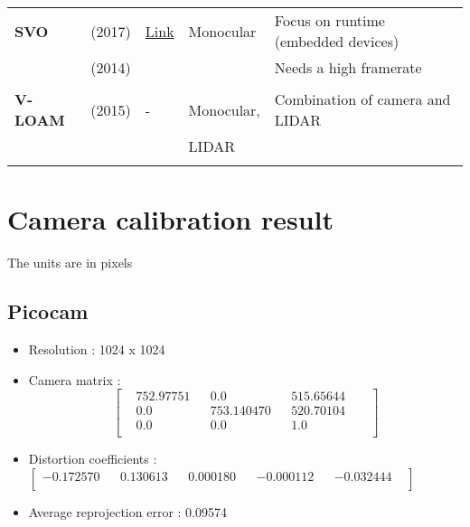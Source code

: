 {\begin{longtable}{l|l|l|l|l}
			\textbf{SVO}           & \cite{7782863} (2017)         & {\href{https://github.com/uzh-rpg/rpg_svo}{Link}}                  & Monocular             & Focus on runtime (embedded devices)\\
			& \cite{Forster2014ICRA} (2014)        &                                                                    &                       & Needs a high framerate\\
			&                                   &                                                                    &                       &\\
			\textbf{V-LOAM}        & \cite{Zhang2015} (2015)           & -                                                                  & Monocular,            & Combination of camera and LIDAR\\
			&                                   &                                                                    & LIDAR                 &\\
			&                                   &                                                                    &                       &\\
		\end{longtable}				
		\newpage
	
\section{Camera calibration result}
\label{section:A.2}
The units are in pixels
\subsection{Picocam}

\begin{itemize}
	\setlength\itemsep{1em}
	\item Resolution : 1024 x 1024
	\item Camera matrix : 
	      \begin{equation*}     
			\begin{bmatrix}
				& 752.97751 & & 0.0 & &  515.65644 & &  \\
				& 0.0 & & 753.140470 & &520.70104  & &\\
				& 0.0 & & 0.0 & &   1.0  & &\\
			\end{bmatrix}
			 \end{equation*}
	\item Distortion coefficients : 
	$ \begin{bmatrix}  
	 	  -0.172570    & & 0.130613  & & 0.000180   &  &-0.000112  & & -0.032444 & \\
	 \end{bmatrix} $ 
	\item Average reprojection error : 0.09574
\end{itemize}
\vspace{10mm}
}
